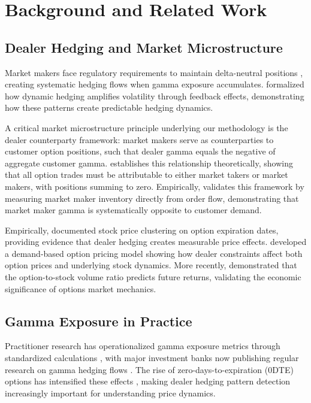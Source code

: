 \section{Background and Related Work}

\subsection{Dealer Hedging and Market Microstructure}

Market makers face regulatory requirements to maintain delta-neutral positions \cite{sec15c31,finra4210}, creating systematic hedging flows when gamma exposure accumulates. \cite{frey1997market} formalized how dynamic hedging amplifies volatility through feedback effects, demonstrating how these patterns create predictable hedging dynamics.

A critical market microstructure principle underlying our methodology is the dealer counterparty framework: market makers serve as counterparties to customer option positions, such that dealer gamma equals the negative of aggregate customer gamma. \cite{anderegg2022impact} establishes this relationship theoretically, showing that all option trades must be attributable to either market takers or market makers, with positions summing to zero. Empirically, \cite{dim2025zero} validates this framework by measuring market maker inventory directly from order flow, demonstrating that market maker gamma is systematically opposite to customer demand.

Empirically, \cite{ni2005stock} documented stock price clustering on option expiration dates, providing evidence that dealer hedging creates measurable price effects. \cite{garleanu2009demand} developed a demand-based option pricing model showing how dealer constraints affect both option prices and underlying stock dynamics. More recently, \cite{ge2016why} demonstrated that the option-to-stock volume ratio predicts future returns, validating the economic significance of options market mechanics.

\subsection{Gamma Exposure in Practice}
Practitioner research has operationalized gamma exposure metrics through standardized calculations \cite{spotgamma2019,spotgamma2021, squeezemetrics2017,squeezemetrics2020}, with major investment banks now publishing regular research on gamma hedging flows \cite{nomura2017}. The rise of zero-days-to-expiration (0DTE) options has intensified these effects \cite{cboe2023,jpmorgan2023}, making dealer hedging pattern detection increasingly important for understanding price dynamics.

